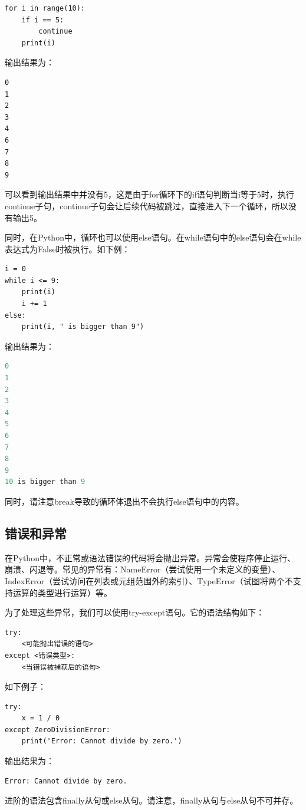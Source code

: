 \documentclass[../../Main.tex]{subfiles}
\begin{document}
\begin{lstlisting}
for i in range(10):
    if i == 5:
        continue
    print(i)
\end{lstlisting}


输出结果为：
\begin{lstlisting}
0
1
2
3
4
6
7
8
9
\end{lstlisting}

可以看到输出结果中并没有5，这是由于for循环下的if语句判断当i等于5时，执行continue子句，continue子句会让后续代码被跳过，直接进入下一个循环，所以没有输出5。

同时，在Python中，循环也可以使用else语句。在while语句中的else语句会在while表达式为False时被执行。如下例：

\begin{lstlisting}
i = 0
while i <= 9:
    print(i)
    i += 1
else:
    print(i, " is bigger than 9")
\end{lstlisting}

输出结果为：
\begin{lstlisting}[language=C]
0
1
2
3
4
5
6
7
8
9
10 is bigger than 9
\end{lstlisting}

同时，请注意break导致的循环体退出不会执行else语句中的内容。

\subsection{错误和异常\PyOnly }
在Python中，不正常或语法错误的代码将会抛出异常。异常会使程序停止运行、崩溃、闪退等。常见的异常有：NameError（尝试使用一个未定义的变量）、IndexError（尝试访问在列表或元组范围外的索引）、TypeError（试图将两个不支持运算的类型进行运算）等。

为了处理这些异常，我们可以使用try-except语句。它的语法结构如下：
\begin{lstlisting}
try:
    <可能抛出错误的语句>
except <错误类型>:
    <当错误被捕获后的语句>
\end{lstlisting}

如下例子：

\begin{lstlisting}
try:
    x = 1 / 0
except ZeroDivisionError:
    print('Error: Cannot divide by zero.')
\end{lstlisting}

输出结果为：
\begin{lstlisting}
Error: Cannot divide by zero.
\end{lstlisting}

进阶的语法包含finally从句或else从句。请注意，finally从句与else从句不可并存。
\end{document}
